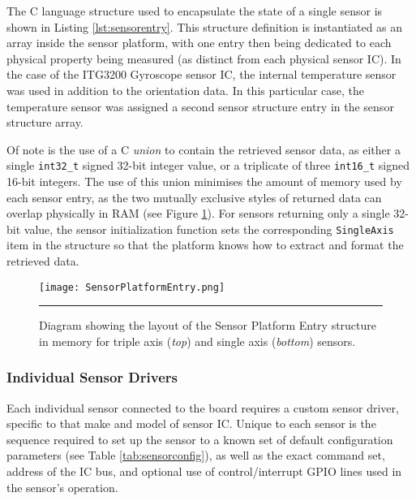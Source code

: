 The C language structure used to encapsulate the state of a single sensor is shown in Listing \ref{lst:sensorentry}. This structure definition is instantiated as an array inside the sensor platform, with one entry then being dedicated to each physical property being measured (as distinct from each physical sensor IC). In the case of the ITG3200 Gyroscope sensor IC, the internal temperature sensor was used in addition to the orientation data. In this particular case, the temperature sensor was assigned a second sensor structure entry in the sensor structure array.



Of note is the use of a C \textit{union} to contain the retrieved sensor data, as either a single \lstinline{int32_t} signed 32-bit integer value, or a triplicate of three \lstinline{int16_t} signed 16-bit integers. The use of this union minimises the amount of memory used by each sensor entry, as the two mutually exclusive styles of returned data can overlap physically in RAM (see Figure \ref{fig:sensorentry}). For sensors returning only a single 32-bit value, the sensor initialization function sets the corresponding \lstinline{SingleAxis} item in the structure so that the platform knows how to extract and format the retrieved data.

\begin{figure}[tbph]
	\vspace{1em}
	\centering
		\texttt{[image: SensorPlatformEntry.png]}
	\rule{35em}{0.5pt}
	\caption[Sensor Platform Entry Structure Diagram]{Diagram showing the layout of the Sensor Platform Entry structure in memory for triple axis (\textit{top}) and single axis (\textit{bottom}) sensors.}
	\label{fig:sensorentry}
\end{figure}

\FloatBarrier
\subsubsection{Individual Sensor Drivers}

Each individual sensor connected to the board requires a custom sensor driver, specific to that make and model of sensor IC. Unique to each sensor is the sequence required to set up the sensor to a known set of default configuration parameters (see Table \ref{tab:sensorconfig}), as well as the exact command set, address of the IC bus, and optional use of control/interrupt GPIO lines used in the sensor's operation.

